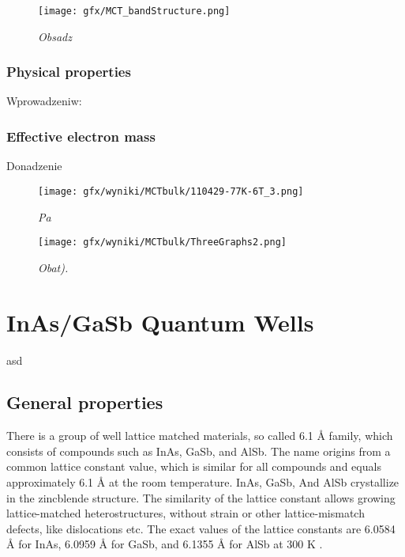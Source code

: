 \documentclass[titlepage,a4paper]{book}
\newcommand{\wciecie}{\quad\phantom{v}}
\begin{document}
\begin{figure}[ht]
	\centering
	\texttt{[image: gfx/MCT\_bandStructure.png]}
	\vspace{-10pt}
	\caption{\textit{Obsadz}}
	\label{asdfg}
\end{figure} 

\subsection{Physical properties}
\wciecie
Wprowadzeniw:

\subsection{Effective electron mass}
\wciecie
Donadzenie  
\begin{figure}[ht]
	\centering
	\texttt{[image: gfx/wyniki/MCTbulk/110429-77K-6T\_3.png]}
	\vspace{-10pt}
	\caption{\textit{Pa}}
	\label{asd}
\end{figure} 

\begin{figure}[ht]
	\centering
	\texttt{[image: gfx/wyniki/MCTbulk/ThreeGraphs2.png]}
	\vspace{-10pt}
	\caption{\textit{Obat).}}
	\label{asdf}
\end{figure} 


\chapter{InAs/GaSb Quantum Wells}
\wciecie
asd
\section{General properties}
There is a group of well lattice matched materials, so called 6.1 Å family, which consists of compounds such as InAs, GaSb, and AlSb. The name origins from a common lattice constant value, which is similar for all compounds and equals approximately 6.1 Å at the room temperature. InAs, GaSb, And AlSb crystallize in the zincblende structure. The similarity of the lattice constant allows growing lattice-matched heterostructures, without strain or other lattice-mismatch defects, like dislocations etc. The exact values of the lattice constants are 6.0584 Å for InAs, 6.0959 Å for GaSb, and 6.1355 Å for AlSb at 300 K \cite{Sze}.
\end{document}
